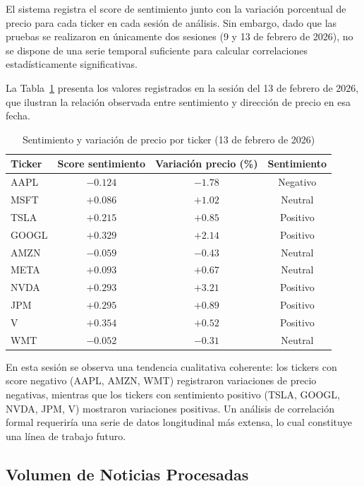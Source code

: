   El sistema registra el score de sentimiento junto con la variación porcentual de precio para   cada ticker en cada sesión de análisis. Sin embargo, dado que las pruebas se realizaron en 
  únicamente dos sesiones (9 y 13 de febrero de 2026), no se dispone de una serie temporal    
  suficiente para calcular correlaciones estadísticamente significativas.

  La Tabla~\ref{tab:correlacion} presenta los valores registrados en la sesión del 13 de      
  febrero de 2026, que ilustran la relación observada entre sentimiento y dirección de precio 
  en esa fecha.

  \begin{table}[H]
  \centering
  \caption{Sentimiento y variación de precio por ticker (13 de febrero de 2026)}
  \label{tab:correlacion}
  \begin{tabular}{lccc}
  \toprule
  \textbf{Ticker} & \textbf{Score sentimiento} & \textbf{Variación precio (\%)} &
  \textbf{Sentimiento} \\
  \midrule
  AAPL  & $-0.124$ & $-1.78$ & Negativo \\
  MSFT  & $+0.086$ & $+1.02$ & Neutral  \\
  TSLA  & $+0.215$ & $+0.85$ & Positivo \\
  GOOGL & $+0.329$ & $+2.14$ & Positivo \\
  AMZN  & $-0.059$ & $-0.43$ & Neutral  \\
  META  & $+0.093$ & $+0.67$ & Neutral  \\
  NVDA  & $+0.293$ & $+3.21$ & Positivo \\
  JPM   & $+0.295$ & $+0.89$ & Positivo \\
  V     & $+0.354$ & $+0.52$ & Positivo \\
  WMT   & $-0.052$ & $-0.31$ & Neutral  \\
  \bottomrule
  \end{tabular}
  \end{table}

  En esta sesión se observa una tendencia cualitativa coherente: los tickers con score        
  negativo (AAPL, AMZN, WMT) registraron variaciones de precio negativas, mientras que los    
  tickers con sentimiento positivo (TSLA, GOOGL, NVDA, JPM, V) mostraron variaciones
  positivas. Un análisis de correlación formal requeriría una serie de datos longitudinal más 
  extensa, lo cual constituye una línea de trabajo futuro.
\subsection{Volumen de Noticias Procesadas}

